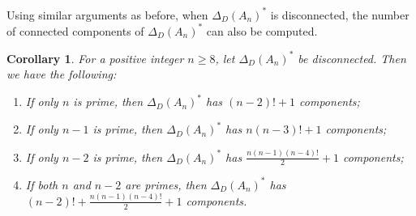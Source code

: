 \documentclass[12pt,a4paper]{article}
\newtheorem{corollary}[theorem]{Corollary}
\begin{document}
Using similar arguments as before, when $\Delta_D(A_n)^*$ is disconnected, the number of connected components of $\Delta_D(A_n)^*$ can also be computed.

\begin{corollary}\label{Reduced_An_components}
 For a positive integer $n\geq 8$, let $\Delta_D(A_n)^*$ be disconnected. Then we have the following:
 \begin{enumerate}[\rm (i)]
     \item If only $n$ is prime, then $\Delta_D(A_n)^*$ has $(n-2)!+1$ components;
     \item If only $n-1$ is prime, then $\Delta_D(A_n)^*$ has $n(n-3)!+1$ components;
     \item If only $n-2$ is prime, then $\Delta_D(A_n)^*$ has $\frac{n(n-1)(n-4)!}{2}+1$ components;
     \item If both $n$ and $n-2$ are primes, then $\Delta_D(A_n)^*$ has $(n-2)!+\frac{n(n-1)(n-4)!}{2}+1$ components.
 \end{enumerate}
\end{corollary}
\end{document}
